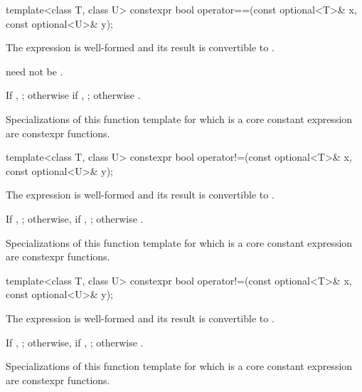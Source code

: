 %
\begin{itemdecl}
template<class T, class U>
  constexpr bool operator==(const optional<T>& x, const optional<U>& y);
\end{itemdecl}

\begin{itemdescr}
\pnum
\constraints
The expression  is well-formed and its result is convertible to .
\begin{note}
 need not be .
\end{note}

\pnum
\returns
If , ; otherwise if , ; otherwise .

\pnum
\remarks
Specializations of this function template for which  is a core constant expression are constexpr functions.
\end{itemdescr}

\begin{removedblock}
%
\begin{itemdecl}
template<class T, class U> constexpr bool operator!=(const optional<T>& x, const optional<U>& y);
\end{itemdecl}

\begin{itemdescr}
\pnum
\constraints
The expression  is well-formed and its result is convertible to .

\pnum
\returns
If , ; otherwise, if , ; otherwise .

\pnum
\remarks
Specializations of this function template for which  is a core constant expression are constexpr functions.
\end{itemdescr}
\end{removedblock}

\begin{addedblock}
%
\begin{itemdecl}
template<class T, class U>
  constexpr bool operator!=(const optional<T>& x, const optional<U>& y);
\end{itemdecl}

\begin{itemdescr}
\pnum
\constraints
The expression  is well-formed and its result is convertible to .

\pnum
\returns
If , ; otherwise, if , ; otherwise .

\pnum
\remarks
Specializations of this function template for which  is a core constant expression are constexpr functions.
\end{itemdescr}
\end{addedblock}

